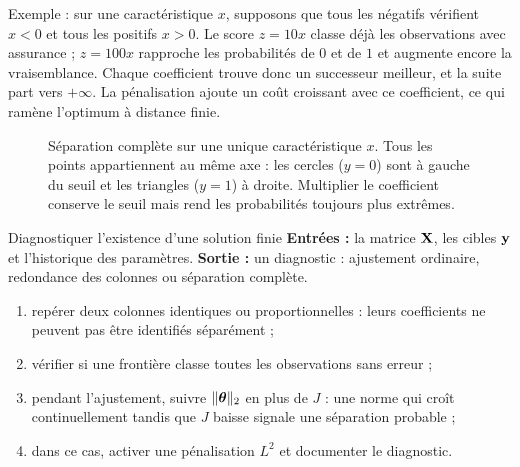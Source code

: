 Exemple : sur une caractéristique $x$, supposons que tous les négatifs vérifient
$x<0$ et tous les positifs $x>0$. Le score $z=10x$ classe déjà les observations
avec assurance ; $z=100x$ rapproche les probabilités de $0$ et de $1$ et augmente
encore la vraisemblance. Chaque coefficient trouve donc un successeur meilleur,
et la suite part vers $+\infty$. La pénalisation ajoute un coût croissant avec ce
coefficient, ce qui ramène l'optimum à distance finie.

\begin{figure}[htbp]
\centering
{}
\caption{Séparation complète sur une unique caractéristique $x$. Tous les points
appartiennent au même axe : les cercles ($y=0$) sont à gauche du seuil et les
triangles ($y=1$) à droite. Multiplier le coefficient conserve le seuil mais rend
les probabilités toujours plus extrêmes.}
\label{fig:complete-separation}
\end{figure}

\begin{procedure}{Diagnostiquer l'existence d'une solution finie}
\textbf{Entrées :} la matrice $\mathbf{X}$, les cibles $\mathbf{y}$ et l'historique des
paramètres. \textbf{Sortie :} un diagnostic : ajustement ordinaire, redondance
des colonnes ou séparation complète.
\begin{enumerate}
  \item repérer deux colonnes identiques ou proportionnelles : leurs coefficients
        ne peuvent pas être identifiés séparément ;
  \item vérifier si une frontière classe toutes les observations sans erreur ;
  \item pendant l'ajustement, suivre $\|\boldsymbol{\theta}\|_2$ en plus de $J$ : une norme qui
        croît continuellement tandis que $J$ baisse signale une séparation probable ;
  \item dans ce cas, activer une pénalisation $L^2$ et documenter le diagnostic.
\end{enumerate}
\end{procedure}

